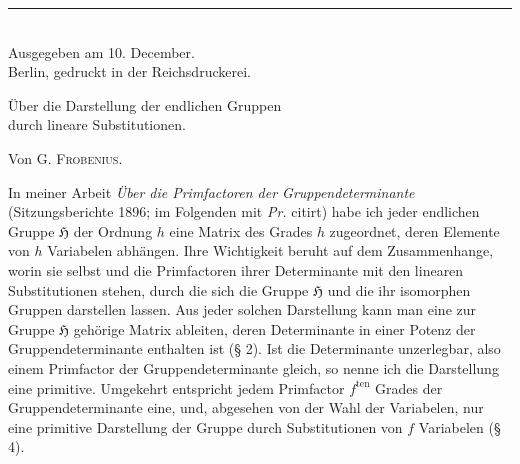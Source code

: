 \documentclass[11pt]{article}
\newcommand{\Hgrp}{\mathfrak{H}}
\newcommand{\ten}{\mathrm{ten}}
\begin{document}
\begin{center}
\vspace{1.0em}
\rule{0.32\linewidth}{0.4pt}\\[0.35em]
Ausgegeben am 10. December.\\[1.8em]
{\scriptsize Berlin, gedruckt in der Reichsdruckerei.}
\end{center}

\clearpage

\begin{center}
{\Large Über die Darstellung der endlichen Gruppen\\durch lineare Substitutionen.}\par
\vspace{1.2em}
Von G. \textsc{Frobenius}.
\end{center}
\vspace{1em}

In meiner Arbeit \emph{Über die Primfactoren der Gruppendeterminante} (Sitzungsberichte 1896; im Folgenden mit \emph{Pr.} citirt) habe ich jeder endlichen Gruppe $\Hgrp$ der Ordnung $h$ eine Matrix des Grades $h$ zugeordnet, deren Elemente von $h$ Variabelen abhängen. Ihre Wichtigkeit beruht auf dem Zusammenhange, worin sie selbst und die Primfactoren ihrer Determinante mit den linearen Substitutionen stehen, durch die sich die Gruppe $\Hgrp$ und die ihr isomorphen Gruppen darstellen lassen. Aus jeder solchen Darstellung kann man eine zur Gruppe $\Hgrp$ gehörige Matrix ableiten, deren Determinante in einer Potenz der Gruppendeterminante enthalten ist (§ 2). Ist die Determinante unzerlegbar, also einem Primfactor der Gruppendeterminante gleich, so nenne ich die Darstellung eine primitive. Umgekehrt entspricht jedem Primfactor $f^{\ten}$ Grades der Gruppendeterminante eine, und, abgesehen von der Wahl der Variabelen, nur eine primitive Darstellung der Gruppe durch Substitutionen von $f$ Variabelen (§ 4).
\end{document}
